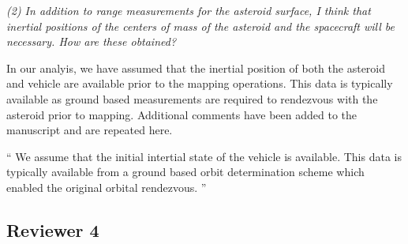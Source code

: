 \documentclass[11pt]{article}
\newenvironment{correction}{\begin{list}{}{\setlength{\leftmargin}{1cm}\setlength{\rightmargin}{1cm}}\vspace{\parsep}\item[]``}{''\end{list}}
\newcommand{\comment}[1]{\item \itshape #1 \normalfont}
\begin{document}
\begin{itemize}
\comment{(2) In addition to range measurements for the asteroid surface, I think that inertial positions of the centers of mass of the asteroid and the spacecraft will be necessary.
How are these obtained?}

In our analyis, we have assumed that the inertial position of both the asteroid and vehicle are available prior to the mapping operations.
This data is typically available as ground based measurements are required to rendezvous with the asteroid prior to mapping.
Additional comments have been added to the manuscript and are repeated here.


\begin{correction}
    We assume that the initial intertial state of the vehicle is available. 
    This data is typically available from a ground based orbit determination scheme which enabled the original orbital rendezvous. 
\end{correction}

\end{itemize}


\clearpage\newpage
\subsection*{Reviewer 4}
\end{document}
